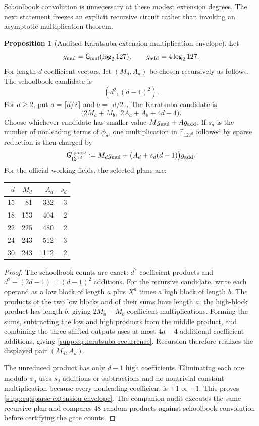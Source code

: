 \documentclass[11pt,a4paper]{article}
\theoremstyle{definition}
\newtheorem{proposition}[theorem]{Proposition}
\theoremstyle{remark}
\newcommand{\F}{\mathbb F}
\newcommand{\Gmul}{\mathsf G_{\rm mul}}
\begin{document}
Schoolbook convolution is unnecessary at these modest extension degrees.  The
next statement freezes an explicit recursive circuit rather than invoking an
asymptotic multiplication theorem.

\begin{proposition}[Audited Karatsuba extension-multiplication envelope]\label{supp:prop:sparse-extension-envelope}
Let
\[
 g_{\rm mul}=\Gmul(\log_2 127),
 \qquad g_{\rm add}=4\log_2 127.
\]
For length-$d$ coefficient vectors, let $(M_d,A_d)$ be chosen recursively as
follows.  The schoolbook candidate is
\[
 (d^2,(d-1)^2).
\]
For $d\ge2$, put $a=\lceil d/2\rceil$ and $b=\lfloor d/2\rfloor$.  The
Karatsuba candidate is
\begin{equation}\label{supp:eq:karatsuba-recurrence}
 \bigl(2M_a+M_b,\;2A_a+A_b+4d-4\bigr).
\end{equation}
Choose whichever candidate has smaller value $Mg_{\rm mul}+Ag_{\rm add}$.
If $s_d$ is the number of nonleading terms of $\phi_d$, one multiplication in
$\F_{127^d}$ followed by sparse reduction is then charged by
\begin{equation}\label{supp:eq:sparse-extension-envelope}
 \mathsf G^{\rm sparse}_{127^d}
 :=M_dg_{\rm mul}+\bigl(A_d+s_d(d-1)\bigr)g_{\rm add}.
\end{equation}
For the official working fields, the selected plans are:
\begin{center}
\begin{tabular}{@{}rrrr@{}}
\toprule
$d$ & $M_d$ & $A_d$ & $s_d$\\
\midrule
15&81&332&3\\
18&153&404&2\\
22&225&480&2\\
24&243&512&3\\
30&243&1112&2\\
\bottomrule
\end{tabular}
\end{center}
\end{proposition}

\begin{proof}
The schoolbook counts are exact: $d^2$ coefficient products and
$d^2-(2d-1)=(d-1)^2$ additions.  For the recursive candidate, write each
operand as a low block of length $a$ plus $X^a$ times a high block of length
$b$.  The products of the two low blocks and of their sums have length $a$;
the high-block product has length $b$, giving $2M_a+M_b$ coefficient
multiplications.  Forming the sums, subtracting the low and high products from
the middle product, and combining the three shifted outputs uses at most
$4d-4$ additional coefficient additions, giving
\eqref{supp:eq:karatsuba-recurrence}.  Recursion therefore realizes the displayed
pair $(M_d,A_d)$.

The unreduced product has only $d-1$ high coefficients.  Eliminating each one
modulo $\phi_d$ uses $s_d$ additions or subtractions and no nontrivial constant
multiplication because every nonleading coefficient is $+1$ or $-1$.  This
proves \eqref{supp:eq:sparse-extension-envelope}.  The companion audit executes the
same recursive plan and compares $48$ random products against schoolbook
convolution before certifying the gate counts.
\end{proof}
\end{document}
